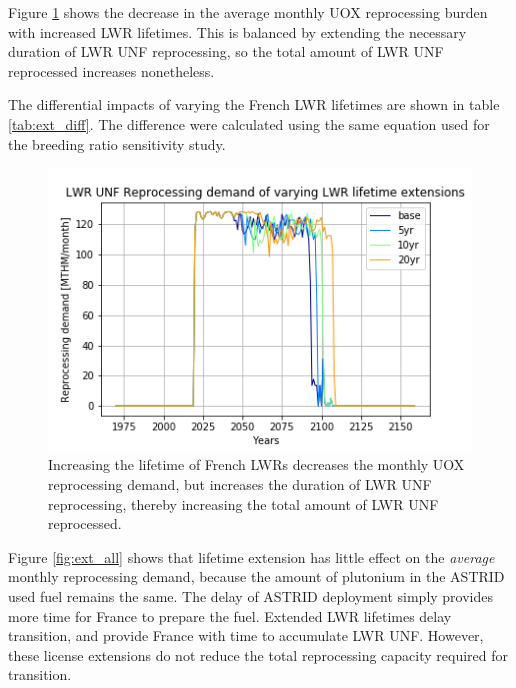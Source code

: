 Figure \ref{fig:ext_uox} shows the decrease in the average monthly
\gls{UOX} reprocessing burden with increased \gls{LWR} lifetimes.
This is balanced by extending the necessary duration of 
\gls{LWR} \gls{UNF} reprocessing,
so
the total amount of \gls{LWR} \gls{UNF} reprocessed increases nonetheless.


The differential impacts of varying the French \gls{LWR} lifetimes are
shown in table \ref{tab:ext_diff}. The difference were calculated
using the same equation used for the breeding ratio sensitivity study.


\begin{figure}[htbp!]
	\begin{center}
		\includegraphics[scale=0.7]{./images/sensitivity/ext_uox_rep.png}
	\end{center}
	\caption{Increasing the lifetime of French \glspl{LWR} decreases the monthly
		\gls{UOX} reprocessing demand, but increases the duration of \gls{LWR} \gls{UNF}
		reprocessing, thereby increasing the total amount of \gls{LWR} \gls{UNF} reprocessed.}
	\label{fig:ext_uox}
\end{figure}

Figure \ref{fig:ext_all} shows that lifetime extension has little
effect on the \emph{average} monthly reprocessing demand, because
the amount of plutonium in the \gls{ASTRID} used fuel remains the same.
The delay of \gls{ASTRID} deployment simply provides more time for
France to prepare the fuel. 
Extended \gls{LWR} lifetimes delay transition, and provide France with
time to accumulate \gls{LWR} \gls{UNF}. However, these 
license extensions do not reduce
the total reprocessing capacity required for transition.


